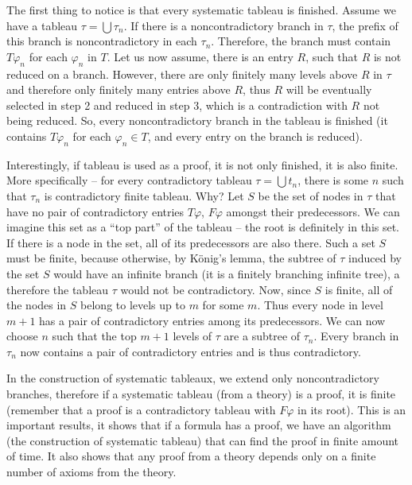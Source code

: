The first thing to notice is that every systematic tableau is finished. Assume we have a tableau $\tau = \bigcup \tau_n$. If there is a noncontradictory branch in $\tau$, the prefix of this branch is noncontradictory in each $\tau_n$. Therefore, the branch must contain $T \varphi_n$ for each $\varphi_n$ in $T$. Let us now assume, there is an entry $R$, such that $R$ is not reduced on a branch. However, there are only finitely many levels above $R$ in $\tau$ and therefore only finitely many entries above $R$, thus $R$ will be eventually selected in step 2 and reduced in step 3, which is a contradiction with $R$ not being reduced. So, every noncontradictory branch in the tableau is finished (it contains $T \varphi_n$ for each $\varphi_n \in T$, and every entry on the branch is reduced).

Interestingly, if tableau is used as a proof, it is not only finished, it is also finite. More specifically -- for every contradictory tableau $\tau = \bigcup t_n$, there is some $n$ such that $\tau_n$ is contradictory finite tableau. Why? Let $S$ be the set of nodes in $\tau$ that have no pair of contradictory entries $T \varphi$, $F \varphi$ amongst their predecessors. We can imagine this set as a ``top part'' of the tableau -- the root is definitely in this set. If there is a node in the set, all of its predecessors are also there. Such a set $S$ must be finite, because otherwise, by König's lemma, the subtree of $\tau$ induced by the set $S$ would have an infinite branch (it is a finitely branching infinite tree), a therefore the tableau $\tau$ would not be contradictory. Now, since $S$ is finite, all of the nodes in $S$ belong to levels up to $m$ for some $m$. Thus every node in level $m+1$ has a pair of contradictory entries among its predecessors. We can now choose $n$ such that the top $m+1$ levels of $\tau$ are a subtree of $\tau_n$. Every branch in $\tau_n$ now contains a pair of contradictory entries and is thus contradictory.

In the construction of systematic tableaux, we extend only noncontradictory branches, therefore if a systematic tableau (from a theory) is a proof, it is finite (remember that a proof is a contradictory tableau with $F \varphi$ in its root). This is an important results, it shows that if a formula has a proof, we have an algorithm (the construction of systematic tableau) that can find the proof in finite amount of time. It also shows that any proof from a theory depends only on a finite number of axioms from the theory. 

